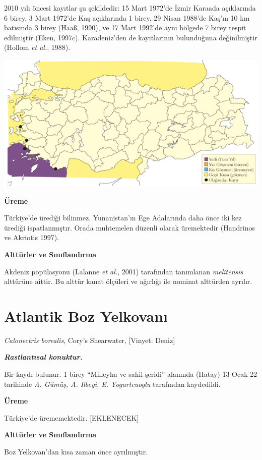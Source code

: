 \documentclass[
  a4paper,
  DIV=11,
  numbers=noendperiod]{scrreprt}
\begin{document}
2010 yılı öncesi kayıtlar şu şekildedir: 15 Mart 1972'de İzmir Karaada
açıklarında 6 birey, 3 Mart 1972'de Kaş açıklarında 1 birey, 29 Nisan
1988'de Kaş'ın 10 km batısında 3 birey (Haaß, 1990), ve 17 Mart 1992'de
aynı bölgede 7 birey tespit edilmiştir (Eken, 1997c). Karadeniz'den de
kayıtlarının bulunduğuna değinilmiştir (Hollom \emph{et al.}, 1988).

\includegraphics{images/harita_Page_050.png}

\textbf{Üreme}

Türkiye'de ürediği bilinmez. Yunanistan'ın Ege Adalarında daha önce iki
kez ürediği ispatlanmıştır. Orada muhtemelen düzenli olarak üremektedir
(Handrinos ve Akriotis 1997).

\textbf{Alttürler ve Sınıflandırma}

Akdeniz popülasyonu (Lalanne \emph{et al.}, 2001) tarafından tanımlanan
\emph{melitensis} alttürüne aittir. Bu alttür kanat ölçüleri ve ağırlığı
ile nominat alttürden ayrılır.

\section{Atlantik Boz Yelkovanı}\label{atlantik-boz-yelkovanux131}

\emph{Calonectris borealis}, Cory's Shearwater, {[}Vinyet: Deniz{]}

\textbf{\emph{Rastlantısal konuktur.}}

Bir kaydı bulunur. 1 birey ``Milleyha ve sahil şeridi'' alanında (Hatay)
13 Ocak 22 tarihinde \emph{A. Gümüş, A. Ilbeyi, E. Yogurtcuoglu}
tarafından kaydedildi.

\textbf{Üreme}

Türkiye'de ürememektedir. {[}EKLENECEK{]}

\textbf{Alttürler ve Sınıflandırma}

Boz Yelkovan'dan kısa zaman önce ayrılmıştır.
\end{document}

